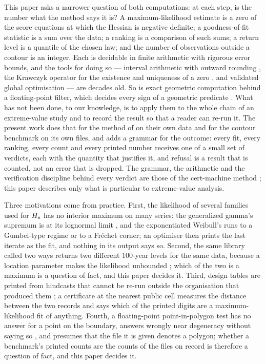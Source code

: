 \documentclass[preprint,11pt,authoryear]{elsarticle}
\begin{document}
This paper asks a narrower question of both computations: at each step, is the number what the method says it is? A maximum-likelihood estimate is a zero of the score equations at which the Hessian is negative definite; a goodness-of-fit statistic is a sum over the data; a ranking is a comparison of such sums; a return level is a quantile of the chosen law; and the number of observations outside a contour is an integer. Each is decidable in finite arithmetic with rigorous error bounds, and the tools for doing so --- interval arithmetic with outward rounding \citep{moore2009}, the Krawczyk operator for the existence and uniqueness of a zero \citep{krawczyk1969,rump2010}, and validated global optimisation \citep{hansen2004,tucker2011} --- are decades old. So is exact geometric computation behind a floating-point filter, which decides every sign of a geometric predicate \citep{fortune1996,shewchuk1997,yap1997}. What has not been done, to our knowledge, is to apply them to the whole chain of an extreme-value study and to record the result so that a reader can re-run it. The present work does that for the method of \citet{reis2026} on their own data and for the contour benchmark on its own files, and adds a grammar for the outcome: every fit, every ranking, every count and every printed number receives one of a small set of verdicts, each with the quantity that justifies it, and refusal is a result that is counted, not an error that is dropped. The grammar, the arithmetic and the verification discipline behind every verdict are those of the cert-machine method \citep{certmethod}; this paper describes only what is particular to extreme-value analysis.

Three motivations come from practice. First, the likelihood of several families used for $H_s$ has no interior maximum on many series: the generalized gamma's supremum is at its lognormal limit \citep{prentice1974,stacy1962}, and the exponentiated Weibull's runs to a Gumbel-type regime or to a Fr\'echet corner; an optimiser then prints the last iterate as the fit, and nothing in its output says so. Second, the same library called two ways returns two different 100-year levels for the same data, because a location parameter makes the likelihood unbounded \citep{hill1963,harper2011}; which of the two is a maximum is a question of fact, and this paper decides it. Third, design tables are printed from hindcasts that cannot be re-run outside the organisation that produced them \citep{bhaskaran2023}; a certificate at the nearest public cell measures the distance between the two records and says which of the printed digits are a maximum-likelihood fit of anything. Fourth, a floating-point point-in-polygon test has no answer for a point on the boundary, answers wrongly near degeneracy without saying so \citep{kettner2008}, and presumes that the file it is given denotes a polygon; whether a benchmark's printed counts are the counts of the files on record is therefore a question of fact, and this paper decides it.
\end{document}

